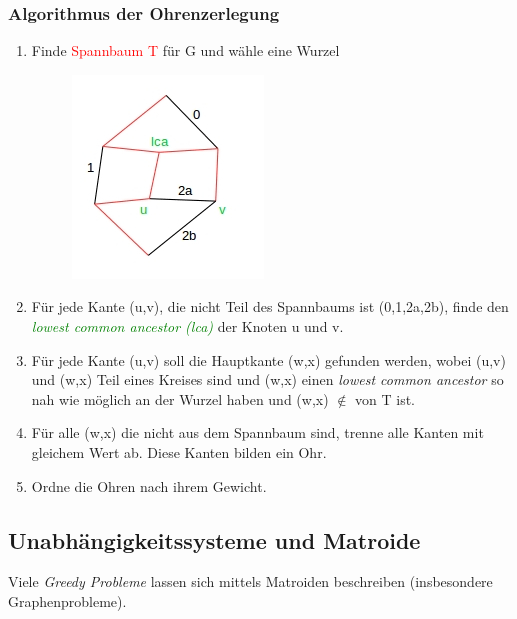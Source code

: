 \subsubsection{Algorithmus der Ohrenzerlegung}
\begin{enumerate}
	\item Finde \textcolor{red}{Spannbaum T} für G und wähle eine Wurzel\\
		\begin{figure}[htp]
		\centering
		\includegraphics[scale=1.00]{lectures/161111/pix/pic2.jpg}
		\end{figure}
	\item Für jede Kante (u,v), die nicht Teil des Spannbaums ist (0,1,2a,2b), finde den \textit{\textcolor{green}{lowest common ancestor (lca)}} der Knoten u und v.
	\item Für jede Kante (u,v) soll die Hauptkante (w,x) gefunden werden, wobei (u,v) und (w,x) Teil eines Kreises sind und (w,x) einen \textit{lowest common ancestor} so nah wie möglich an der Wurzel haben und (w,x) $\notin$ von T ist.
	\item Für alle (w,x) die nicht aus dem Spannbaum sind, trenne alle Kanten mit gleichem Wert ab. Diese Kanten bilden ein Ohr.
	\item Ordne die Ohren nach ihrem Gewicht. 
\end{enumerate}

\newpage
\subsection{Unabhängigkeitssysteme und Matroide}

Viele \textit{Greedy Probleme} lassen sich mittels Matroiden beschreiben (insbesondere Graphenprobleme).

